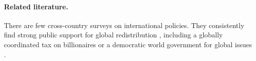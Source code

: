 \documentclass[12pt,english]{article}
\begin{document}
\begin{bibunit}

\paragraph{Related literature.} %
There are few cross-country surveys on international policies. They consistently find strong public support for global redistribution \citep{fabre_majority_2025}, including a globally coordinated tax on billionaires \citep{cappelen_majority_2025} or a democratic world government for global issues \citep{ghassim_who_2024}. %



\end{bibunit}
\end{document}
